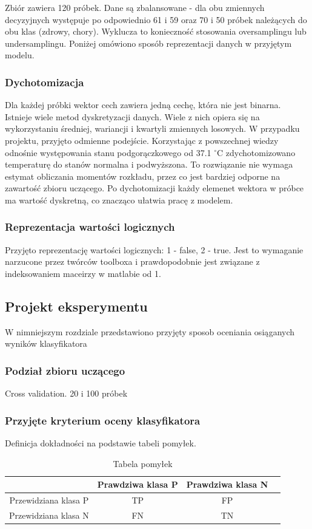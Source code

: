 \documentclass{article}
\begin{document}
Zbiór zawiera 120 próbek. Dane są zbalansowane - dla obu zmiennych decyzyjnych występuje po odpowiednio 61 i 59 oraz 70 i 50 próbek należących do obu klas (zdrowy, chory). Wyklucza to konieczność stosowania oversamplingu lub undersamplingu. Poniżej omówiono sposób reprezentacji danych w przyjętym modelu.

\subsubsection{Dychotomizacja}
Dla każdej próbki wektor cech zawiera jedną cechę, która nie jest binarna. Istnieje wiele metod dyskretyzacji danych. Wiele z nich opiera się na wykorzystaniu średniej, wariancji i kwartyli zmiennych losowych. W przypadku projektu, przyjęto odmienne podejście. Korzystając z powszechnej wiedzy odnośnie występowania stanu podgorączkowego od 37.1 $^{\circ}$C zdychotomizowano temperaturę do stanów normalna i podwyższona. To rozwiązanie nie wymaga estymat obliczania momentów rozkładu, przez co jest bardziej odporne na zawartość zbioru uczącego. Po dychotomizacji każdy elemenet wektora w próbce ma wartość dyskretną, co znacząco ułatwia pracę z modelem.

\subsubsection{Reprezentacja wartości logicznych}
Przyjęto reprezentację wartości logicznych: 1 - false, 2 - true. Jest to wymaganie narzucone przez twórców toolboxa i prawdopodobnie jest związane z indeksowaniem maceirzy w matlabie od 1. 

\subsection{Projekt eksperymentu}
W nimniejszym rozdziale przedstawiono przyjęty sposob oceniania osiąganych wyników klasyfikatora

\subsubsection{Podział zbioru uczącego}
Cross validation. 20 i 100 próbek

\subsubsection{Przyjęte kryterium oceny klasyfikatora}
Definicja dokładności na podstawie tabeli pomyłek.

\begin{table}
\caption{Tabela pomyłek}
\label{nosiy OR}
\centering
\begin{tabular}{|c|c|c|c|}
  \hline 
   & Prawdziwa klasa P & Prawdziwa klasa N \\
  \hline
  Przewidziana klasa P & TP & FP \\
  \hline
  Przewidziana klasa N & FN & TN \\
  \hline
\end{tabular}
\end{table}
\end{document}
